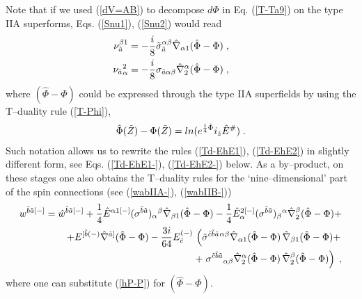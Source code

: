 \documentclass[a4paper,11pt]{article}
\begin{document}
Note that if we used (\ref{dV=AB}) to decompose $d\Phi$ in 
Eq. (\ref{T-Ta9}) on the type IIA superforms, 
Eqs. (\ref{Snu1}), (\ref{Snu2}) 
would read 
\begin{eqnarray}\label{Snu1-}
\nu^{ {\beta}1}_{ {\tilde{a}}} = - {i\over 8} 
\tilde{\sigma}_{\tilde{a}}^{\alpha\beta} 
\hat{\nabla}_{\alpha 1}(\hat{\Phi}- {\Phi}) \; , \qquad 
\\  
\label{Snu2-} 
\nu_{ {\tilde{a}}}{}^2_{ {\alpha}} = - {i\over 8}  
{\sigma}_{\tilde{a}\alpha\beta} 
\hat{\nabla}^{\alpha}_2 (\hat{\Phi}- {\Phi}) \; , \qquad
\end{eqnarray} 
where $(\hat{\Phi}- {\Phi})$ could be expressed through the type IIA 
superfields by using the T--duality rule (\ref{T-Phi}), 
\begin{eqnarray}\label{hP-P}
\hat{\Phi}(\tilde{Z})- {\Phi}(\tilde{Z})= ln(e^{{1\over 4}\hat{\Phi}}
i_{\hat{z}}\hat{E}^{\#})\; .
\end{eqnarray} 
Such notation allows us
to rewrite the rules (\ref{Td-EhE1}), (\ref{Td-EhE2})    
in slightly different form, 
see Eqs. (\ref{Td-EhE1-}), (\ref{Td-EhE2-}) below.  
As a by--product, on these stages one also obtains the T--duality rules for 
the `nine--dimensional' part of the spin connections (see (\ref{wabIIA-}), 
(\ref{wabIIB-}))
\begin{eqnarray}\label{Td-w-w}
w^{\tilde{b}\tilde{a} [-]}  = 
\hat{w}^{\tilde{b}\tilde{a} [-]}+ 
{1\over 4} \hat{E}^{\alpha 1[-]} 
(\sigma^{\tilde{b}\tilde{a}})_{\alpha }{}^{\beta} \hat{\nabla}_{\beta 1} 
(\hat{\Phi}- {\Phi}) - 
{1\over 4} \hat{E}_{\alpha }^{2[-]} 
(\sigma^{\tilde{b}\tilde{a}})_{\beta}{}^{\alpha } \hat{\nabla}^{\beta}_2
(\hat{\Phi}- {\Phi}) + \nonumber \\  + 
{E}^{[\tilde{b}(-)} \hat{\nabla}^{\tilde{a}]} 
(\hat{\Phi}- {\Phi}) 
- {3i\over 64} {E}_{\tilde{c}}^{(-)} 
\, \left(\tilde{\sigma}^{\tilde{c}\tilde{b}\tilde{a}}{}^{\alpha\beta} 
\hat{\nabla}_{\alpha 1} (\hat{\Phi}- {\Phi})
\, \hat{\nabla}_{\beta 1} (\hat{\Phi}- {\Phi}) +\right. 
\nonumber \\  \qquad + \left.
{\sigma}^{\tilde{c}\tilde{b}\tilde{a}}{}_{\alpha\beta} 
\hat{\nabla}^{\alpha}_2 (\hat{\Phi}- {\Phi})\, \hat{\nabla}^{\beta }_2 
(\hat{\Phi}- {\Phi}) \right) 
\; , 
\end{eqnarray}
where one can substitute (\ref{hP-P})
for $(\hat{\Phi}- {\Phi})$. 
\end{document}
